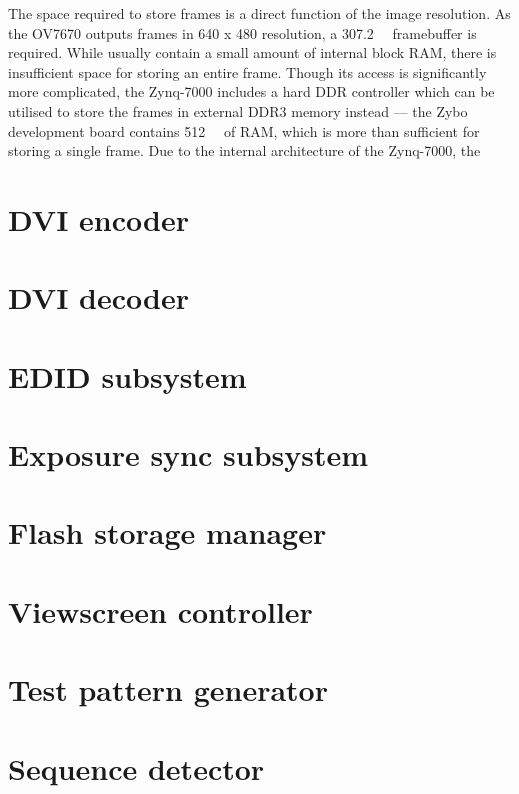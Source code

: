 The space required to store frames is a direct function of the image resolution. As the OV7670 outputs frames in 640 x 480 resolution, a \SI{307.2}{\kilo\bytes} framebuffer is required. While  usually contain a small amount of internal block RAM, there is insufficient space for storing an entire frame. Though its access is significantly more complicated, the Zynq-7000 includes a hard DDR controller which can be utilised to store the frames in external DDR3 memory instead --- the Zybo development board contains \SI{512}{\mega\bytes} of RAM, which is more than sufficient for storing a single frame. Due to the internal architecture of the Zynq-7000, the \





\section{DVI encoder}


\section{DVI decoder}
\section{EDID subsystem}
\section{Exposure sync subsystem}
\section{Flash storage manager}
\section{Viewscreen controller}
\section{Test pattern generator}
\section{Sequence detector}